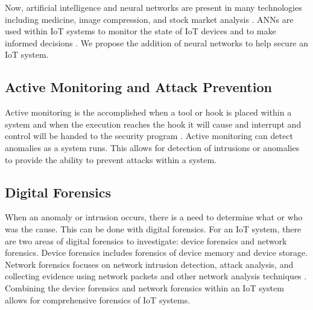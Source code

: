 \documentclass[../main.tex]{subfiles}
\begin{document}
Now, artificial intelligence and neural networks are present in many technologies including medicine, image compression, and stock market analysis \cite{nn-apps}. ANNs are used within IoT systems to monitor the state of IoT devices and to make informed decisions \cite{7190434}. We propose the addition of neural networks to help secure an IoT system.

\subsection{Active Monitoring and Attack Prevention}

Active monitoring is the accomplished when a tool or hook is placed within a system and when the execution reaches the hook it will cause and interrupt and control will be handed to the security program \cite{monirullares}. Active monitoring can detect anomalies as a system runs. This allows for detection of intrusions or anomalies to provide the ability to prevent attacks within a system.

\subsection{Digital Forensics}

When an anomaly or intrusion  occurs, there is a need to determine what or who was the cause. This can be done with digital forensics. For an IoT system, there are two areas of digital forensics to investigate: device forensics and network forensics. Device forensics includes forensics of device memory and device storage. Network forensics focuses on network intrusion detection, attack analysis, and collecting evidence using network packets and other network analysis techniques \cite{6414014}. Combining the device forensics and network forensics within an IoT system allows for comprehensive forensics of IoT systems.
\end{document}
